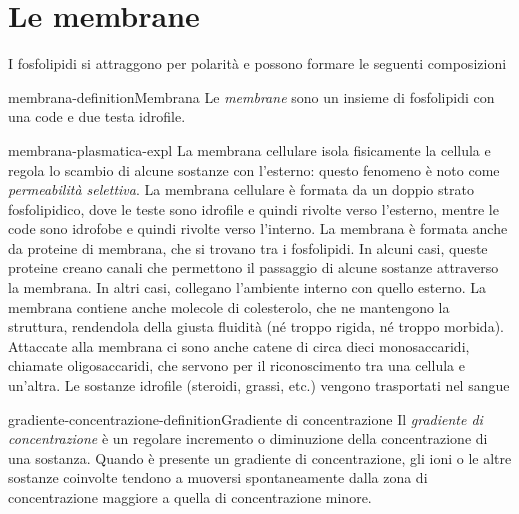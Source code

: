 \documentclass[preview]{standalone}
\begin{document}
\genpage

\section{Le membrane}

\begin{plainhtml}
    I fosfolipidi si attraggono per polarità e possono formare le seguenti composizioni
\end{plainhtml}


\begin{snippetdefinition}{membrana-definition}{Membrana}
    Le \textit{membrane} sono un insieme di fosfolipidi con una code e due testa idrofile.
\end{snippetdefinition}

\begin{snippet}{membrana-plasmatica-expl}
    La membrana cellulare isola fisicamente la cellula e regola lo scambio di alcune sostanze
    con l'esterno: questo fenomeno è noto come \textit{permeabilità selettiva}. La membrana cellulare
    è formata da un doppio strato fosfolipidico, dove le teste sono idrofile e quindi rivolte verso
    l'esterno, mentre le code sono idrofobe e quindi rivolte verso l'interno. La membrana è
    formata anche da proteine di membrana, che si trovano tra i fosfolipidi. In alcuni casi, queste
    proteine creano canali che permettono il passaggio di alcune sostanze attraverso la
    membrana. In altri casi, collegano l'ambiente interno con quello esterno. La membrana
    contiene anche molecole di colesterolo, che ne mantengono la struttura, rendendola della
    giusta fluidità (né troppo rigida, né troppo morbida). Attaccate alla membrana ci sono anche
    catene di circa dieci monosaccaridi, chiamate oligosaccaridi, che servono per il
    riconoscimento tra una cellula e un'altra.
    Le sostanze idrofile (steroidi, grassi, etc.) vengono trasportati nel sangue
\end{snippet}

\begin{snippetdefinition}{gradiente-concentrazione-definition}{Gradiente di concentrazione}
    Il \textit{gradiente di concentrazione} è un regolare incremento o diminuzione della concentrazione di una sostanza. Quando è presente un gradiente di concentrazione, gli ioni o le altre sostanze coinvolte tendono a muoversi spontaneamente dalla zona di concentrazione maggiore a quella di concentrazione minore.
\end{snippetdefinition}
\end{document}
